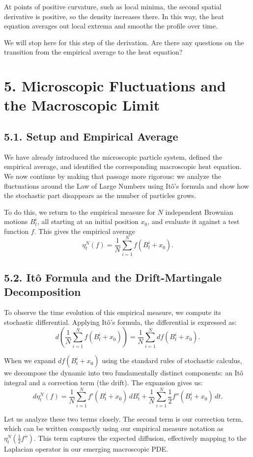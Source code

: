 \documentclass[11pt]{article}
\theoremstyle{definition}
\theoremstyle{remark}
\begin{document}
At points of positive curvature, such as local minima, the second spatial derivative is positive, so the density increases there. In this way, the heat equation averages out local extrema and smooths the profile over time.

We will stop here for this step of the derivation. Are there any questions on the transition from the empirical average to the heat equation?

\section*{5. Microscopic Fluctuations and the Macroscopic Limit}
\subsection*{5.1. Setup and Empirical Average}
We have already introduced the microscopic particle system, defined the empirical average, and identified the corresponding macroscopic heat equation. We now continue by making that passage more rigorous: we analyze the fluctuations around the Law of Large Numbers using It\^o's formula and show how the stochastic part disappears as the number of particles grows.

To do this, we return to the empirical measure for $N$ independent Brownian motions $B_t^i$, all starting at an initial position $x_0$, and evaluate it against a test function $f$. This gives the empirical average
\[
\eta_t^N(f)=\frac{1}{N}\sum_{i=1}^N f(B_t^i+x_0).
\]

\subsection*{5.2. It\^o Formula and the Drift-Martingale Decomposition}
To observe the time evolution of this empirical measure, we compute its stochastic differential. Applying It\^o's formula, the differential is expressed as:
\[
d\!\left(
\frac{1}{N}\sum_{i=1}^N f(B_t^i+x_0)
\right)
=
\frac{1}{N}\sum_{i=1}^N df(B_t^i+x_0).
\]

When we expand $df(B_t^i+x_0)$ using the standard rules of stochastic calculus, we decompose the dynamic into two fundamentally distinct components: an It\^o integral and a correction term (the drift). The expansion gives us:
\[
d\eta_t^N(f)
=
\frac{1}{N}\sum_{i=1}^N f'(B_t^i+x_0)\,dB_t^i
+
\frac{1}{N}\sum_{i=1}^N \frac{1}{2}f''(B_t^i+x_0)\,dt.
\]

Let us analyze these two terms closely. The second term is our correction term, which can be written compactly using our empirical measure notation as $\eta_t^N\!\left(\frac{1}{2}f''\right)$. This term captures the expected diffusion, effectively mapping to the Laplacian operator in our emerging macroscopic PDE.
\end{document}

